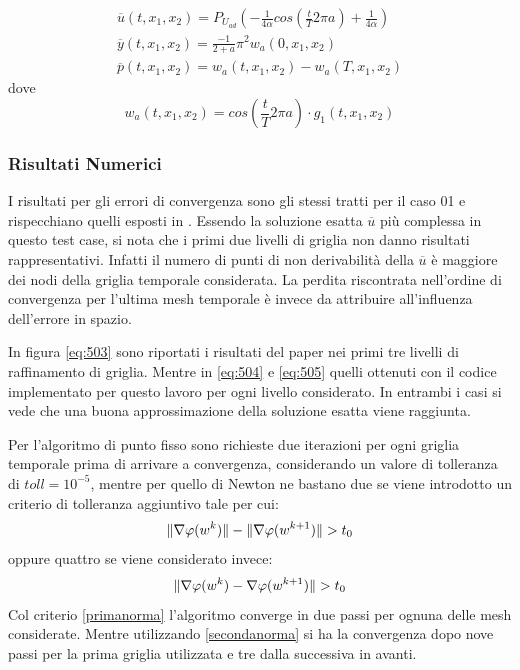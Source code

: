 {\renewcommand\arraystretch{2}
\begin{equation}
\begin{array}{c}
\overline{u}(t,x_1,x_2) = P_{U_{ad}} \left( -\frac{1}{4\alpha}cos \left( \frac{t}{T}2{\pi}a \right) +\frac{1}{4\alpha} \right) \\
\overline{y}(t,x_1,x_2) = \frac{- 1}{2 + a}{\pi}^2w_a(0,x_1,x_2) \\
\overline{p}(t,x_1,x_2) = w_a(t,x_1,x_2) - w_a(T,x_1,x_2)
\end{array}
\label{eq:507}
\end{equation}
}
dove
\begin{equation}
w_a(t,x_1,x_2) = cos \left( \frac{t}{T}2{\pi}a \right) \cdot g_1(t,x_1,x_2)
\label{eq:508}
\end{equation}

\subsubsection{Risultati Numerici}
I risultati per gli errori di convergenza sono gli stessi tratti per il caso 01 e rispecchiano quelli esposti in \cite{MAIN}. Essendo la soluzione esatta $\overline{u}$ più complessa in questo test case, si nota che i primi due livelli di griglia non danno risultati rappresentativi. Infatti il numero di punti di non derivabilità della $\overline{u}$ è maggiore dei nodi della griglia temporale considerata.
La perdita riscontrata nell'ordine di convergenza per l'ultima mesh temporale è invece da attribuire all'influenza dell'errore in spazio.
\par
In figura \ref{eq:503} sono riportati i risultati del paper \cite{MAIN} nei primi tre livelli di raffinamento di griglia. Mentre in \ref{eq:504} e \ref{eq:505} quelli ottenuti con il codice implementato per questo lavoro per ogni livello considerato. In entrambi i casi si vede che una buona approssimazione della soluzione esatta viene raggiunta.
\par
Per l'algoritmo di punto fisso sono richieste due iterazioni per ogni griglia temporale prima di arrivare a convergenza, considerando un valore di tolleranza di $toll=10^{-5}$, mentre per quello di Newton ne bastano due se viene introdotto un criterio di tolleranza aggiuntivo tale per cui:
\begin{equation}
\lVert\nabla\varphi(w^k)\rVert - \lVert\nabla\varphi(w^{k+1})\rVert > t_0
\label{primanorma}
\end{equation} 
oppure quattro se viene considerato invece:
\begin{equation}
\lVert\nabla\varphi(w^k) - \nabla\varphi(w^{k+1})\rVert > t_0
\label{secondanorma}
\end{equation}
Col criterio \ref{primanorma} l'algoritmo converge in due passi per ognuna delle mesh considerate. Mentre utilizzando \ref{secondanorma} si ha la convergenza dopo nove passi per la prima griglia utilizzata e tre dalla successiva in avanti.

